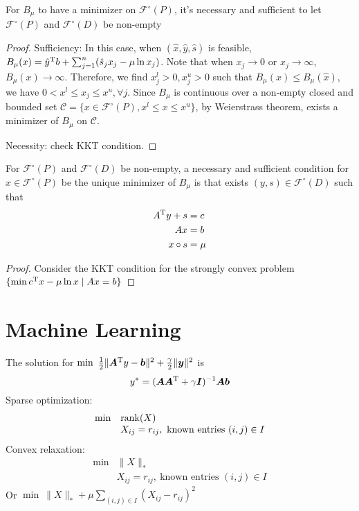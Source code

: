 \begin{proposition}
For $B_\mu$ to have a minimizer on $\mathcal{F}^\circ(P)$, it's necessary and sufficient to let $\mathcal{F}^\circ(P)$ and $\mathcal{F}^\circ(D)$ be non-empty
\end{proposition}
\begin{proof}
Sufficiency: In this case, when $(\hat{x},\hat{y},\hat{s})$ is feasible, $B_\mu(x) = \hat{y}^{\mathrm T} b + \sum_{j=1}^n(\hat{s}_jx_j-\mu\ln x_j)$.
Note that when $x_j\to0$ or $x_j\to\infty$, $B_\mu(x)\to\infty$. Therefore, we find $x^{l}_j>0,x^u_j>0$ such that $B_{\mu}(x)\le B_{\mu}(\hat{x})$, we have $0<x^l\le x_j\le x^u,\forall j$.
Since $B_\mu$ is continuous over a non-empty closed and bounded set $\mathcal{C}=\{x\in\mathcal{F}^\circ(P), x^l\le x\le x^u\}$, by Weierstrass theorem, exists a minimizer of $B_{\mu}$ on $\mathcal{C}$.

Necessity: check KKT condition.
\end{proof}
\begin{proposition}
For $\mathcal{F}^\circ(P)$ and $\mathcal{F}^\circ(D)$ be non-empty, a necessary and sufficient condition for $x\in\mathcal{F}^\circ(P)$ be the unique minimizer of $B_\mu$ is that exists $(y,s)\in\mathcal{F}^\circ(D)$ such that
\begin{align*}
A^{\mathrm T} y+s&=c\\
Ax&=b\\
x\circ s&=\mu
\end{align*}
\end{proposition}
\begin{proof}
Consider the KKT condition for the strongly convex problem $\{\min c^{\mathrm T} x - \mu\ln x\mid Ax=b\}$
\end{proof}

\section{Machine Learning}
The solution for $\min~\frac{1}{2}\|\bm A^{\mathrm T} y-\bm b\|^2+\frac{\gamma}{2}\|\bm y\|^2$ is
\[
y^*=(\bm A\bm A^{\mathrm T}+\gamma\bm I)^{-1}\bm A\bm b
\]
Sparse optimization:
\[
\begin{array}{ll}
\min&\operatorname{rank}(X)\\
&X_{ij}=r_{ij},\ \text{known entries $(i,j)\in I$}
\end{array}
\]
Convex relaxation:
\[
\begin{array}{ll}
\min&\|X\|_*\\
&X_{ij}=r_{ij},\ \text{known entries $(i,j)\in I$}
\end{array}
\]
 Or $\min~\|X\|_*+\mu\sum_{(i,j)\in I}(X_{ij}-r_{ij})^2$

